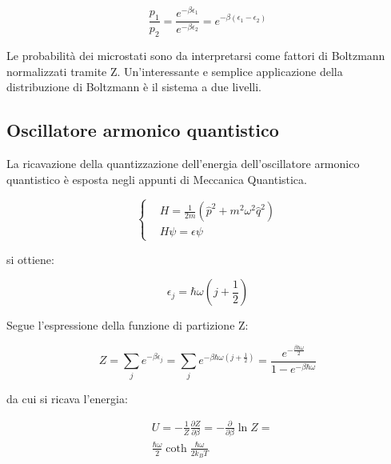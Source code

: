 \documentclass{article}
\begin{document}
\begin{equation}
    \frac{p_1}{p_2}=\frac{e^{-\beta \epsilon_1}}{e^{-\beta \epsilon_2}}=e^{-\beta(\epsilon_1-\epsilon_2)}
\end{equation}

Le probabilità dei microstati sono da interpretarsi come fattori di Boltzmann normalizzati tramite Z.
Un'interessante e semplice applicazione della distribuzione di Boltzmann è il sistema a due livelli.


\subsection{Oscillatore armonico quantistico}

La ricavazione della quantizzazione dell'energia dell'oscillatore armonico quantistico è esposta negli appunti di Meccanica Quantistica.

\begin{equation}
    \left\{
    \begin{aligned}
         & H=\frac{1}{2m}(\hat{p}^2+m^2\omega^2\hat{q}^2) \\
         & H\psi=\epsilon\psi
    \end{aligned}
    \right.
\end{equation}

si ottiene:

\begin{equation}
    \epsilon_j=\hbar\omega(j+\frac{1}{2})
\end{equation}

Segue l'espressione della funzione di partizione Z:

\begin{equation}
    Z=\sum_{j}e^{-\beta\epsilon_j}=\sum_{j}e^{-\beta\hbar\omega(j+\frac{1}{2})}=\frac{e^{-\frac{\beta\hbar\omega}{2}}}{1-e^{-\beta\hbar\omega}}
\end{equation}

da cui si ricava l'energia:


\begin{equation}
    \begin{aligned}
         & U=-\frac{1}{Z}\frac{\partial Z}{\partial \beta}= -\frac{\partial}{\partial \beta}\ln{Z}= \\
         & \frac{\hbar \omega}{2}\coth{\frac{\hbar \omega}{2k_BT}}
    \end{aligned}
\end{equation}
\end{document}
